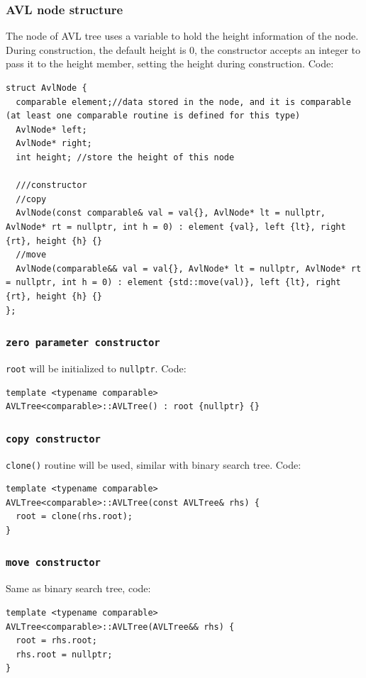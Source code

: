 \documentclass[12pt]{book}
\begin{document}
\subsubsection{AVL node structure}
\label{sec:orgf111e9d}
The node of AVL tree uses a variable to hold the height information of the node. During construction, the default height is 0, the constructor accepts an integer to pass it to the height member, setting the height during construction. Code:
\begin{verbatim}
struct AvlNode {
  comparable element;//data stored in the node, and it is comparable (at least one comparable routine is defined for this type)
  AvlNode* left;
  AvlNode* right;
  int height; //store the height of this node

  ///constructor
  //copy
  AvlNode(const comparable& val = val{}, AvlNode* lt = nullptr, AvlNode* rt = nullptr, int h = 0) : element {val}, left {lt}, right {rt}, height {h} {}
  //move
  AvlNode(comparable&& val = val{}, AvlNode* lt = nullptr, AvlNode* rt = nullptr, int h = 0) : element {std::move(val)}, left {lt}, right {rt}, height {h} {}
};
\end{verbatim}
\subsubsection{\texttt{zero parameter constructor}}
\label{sec:orge8bd780}
\texttt{root} will be initialized to \texttt{nullptr}. Code:
\begin{verbatim}
template <typename comparable>
AVLTree<comparable>::AVLTree() : root {nullptr} {}
\end{verbatim}
\subsubsection{\texttt{copy constructor}}
\label{sec:org13ee83c}
\texttt{clone()} routine will be used, similar with binary search tree. Code:
\begin{verbatim}
template <typename comparable>
AVLTree<comparable>::AVLTree(const AVLTree& rhs) {
  root = clone(rhs.root);
}
\end{verbatim}
\subsubsection{\texttt{move constructor}}
\label{sec:orgc9b48d8}
Same as binary search tree, code:
\begin{verbatim}
template <typename comparable>
AVLTree<comparable>::AVLTree(AVLTree&& rhs) {
  root = rhs.root;
  rhs.root = nullptr;
}
\end{verbatim}
\end{document}
